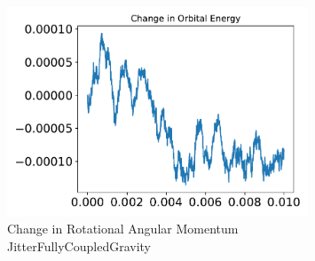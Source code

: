 \begin{figure}[htbp]\centerline{\includegraphics[width=0.80\textwidth]{AutoTeX/ChangeInRotationalAngularMomentumJitterFullyCoupledGravity}}\caption{Change in Rotational Angular Momentum JitterFullyCoupledGravity}\label{fig:ChangeInRotationalAngularMomentumJitterFullyCoupledGravity}\end{figure}